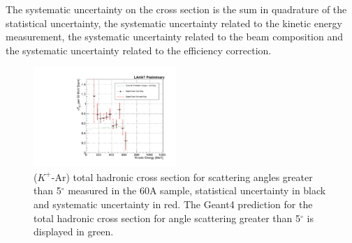 The systematic uncertainty on the cross section is the sum in quadrature of the statistical uncertainty, the systematic uncertainty related to the kinetic energy measurement, the systematic uncertainty related to the beam composition and the systematic uncertainty related to the efficiency correction.

\begin{figure}[htb]
\centering
\includegraphics[width=0.48\textwidth]{Chapter-7/Images/TheMoneyPlotK.pdf}
\caption{ ($K^+$-Ar) total hadronic cross section for  scattering angles greater than 5$^\circ$ measured in the 60A sample, statistical uncertainty in black and systematic uncertainty in red. The Geant4 prediction for the total hadronic cross section for angle scattering greater than 5$^\circ$ is displayed in green. } 
\label{fig:FinalXSKaon}
\end{figure}

